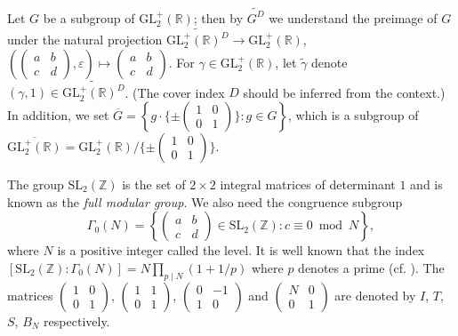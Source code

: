 \documentclass[12pt]{amsart}
\numberwithin{equation}{section}
\theoremstyle{plain}
\theoremstyle{definition}
\theoremstyle{remark}
\newcommand\tbtmat[4]{\left(\begin{smallmatrix}{#1} & {#2} \\ {#3} & {#4}\end{smallmatrix}\right)}
\newcommand\slZ{\mathrm{SL}_2(\mathbb{Z})}
\newcommand\glpR{\mathrm{GL}_2^{+}(\mathbb{R})}
\newcommand\elesltRaDs[5]{\left(\left(\begin{smallmatrix}{#1} & {#2} \\ {#3} & {#4}\end{smallmatrix}\right),{#5}\right)}
\newcommand\Dcover[2]{\widetilde{#1^{#2}}}
\begin{document}
Let $G$ be a subgroup of $\glpR$; then by $\Dcover{G}{D}$ we understand the preimage of $G$ under the natural projection $\Dcover{\glpR}{D}\rightarrow\glpR$, $\elesltRaDs{a}{b}{c}{d}{\varepsilon}\mapsto\tbtmat{a}{b}{c}{d}$. For $\gamma\in\glpR$, let $\widetilde{\gamma}$ denote $(\gamma,1)\in\Dcover{\glpR}{D}$. (The cover index $D$ should be inferred from the context.) In addition, we set $\overline{G}=\left\{g\cdot\{\pm \tbtmat{1}{0}{0}{1}\}\colon g\in G\right\}$, which is a subgroup of $\overline{\glpR}=\glpR/\{\pm \tbtmat{1}{0}{0}{1}\}$.

The group $\slZ$ is the set of $2\times 2$ integral matrices of determinant $1$ and is known as the \emph{full modular group}. We also need the congruence subgroup
\begin{equation*}
\Gamma_0(N)=\left\{\tbtmat{a}{b}{c}{d}\in\slZ\colon c \equiv 0 \bmod N\right\},
\end{equation*}
where $N$ is a positive integer called the level. It is well known that the index $[\slZ\colon\Gamma_0(N)]=N\prod_{p \mid N}(1+1/p)$ where $p$ denotes a prime (cf. \cite[Coro. 6.2.13]{CS17}). The matrices $\tbtmat{1}{0}{0}{1}$, $\tbtmat{1}{1}{0}{1}$, $\tbtmat{0}{-1}{1}{0}$ and $\tbtmat{N}{0}{0}{1}$ are denoted by $I$, $T$, $S$, $B_N$ respectively.
\end{document}
